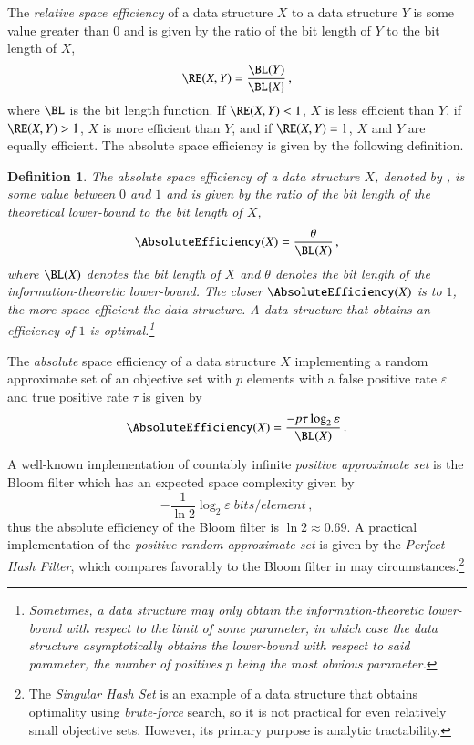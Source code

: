 \documentclass[10pt,final,hidelinks]{article}
\numberwithin{equation}{section}
\newcommand{\p}{p}
\newcommand{\tprate}{\tau}
\newcommand{\fprate}{\varepsilon}
\newcommand{\envnumstyle}{chapter}
\renewcommand{\envnumstyle}{chapter}
\renewcommand{\envnumstyle}{section}
\theoremstyle{plain}
\newtheorem{definition}{Definition}[\envnumstyle]
\begin{document}
The \emph{relative space efficiency} of a data structure $X$ to a data structure $Y$ is some value greater than $0$ and is given by the ratio of the bit length of $Y$ to the bit length of $X$,
\begin{equation}
    \RE(X,Y) = \frac{\BL(Y)}{\BL{X}}\,,
\end{equation}
where $\BL$ is the bit length function.
If $\RE(X,Y) < 1$, $X$ is less efficient than $Y$, if $\RE(X,Y) > 1$, $X$ is more efficient than $Y$, and if $\RE(X,Y) = 1$, $X$ and $Y$ are equally efficient.
The absolute space efficiency is given by the following definition.
\begin{definition}
The absolute space efficiency of a data structure $X$, denoted by , is some value between $0$ and $1$ and is given by the ratio of the bit length of the theoretical lower-bound to the bit length of $X$,
\begin{equation}
    \AbsoluteEfficiency(X) = \frac{\theta}{\BL(X)}\,,
\end{equation}
where $\BL(X)$ denotes the bit length of $X$ and $\theta$ denotes the bit length of the information-theoretic lower-bound.
The closer $\AbsoluteEfficiency(X)$ is to $1$, the more space-efficient the data structure.
A data structure that obtains an efficiency of $1$ is \emph{optimal}.\footnote{Sometimes, a data structure may only obtain the information-theoretic lower-bound with respect to the limit of some parameter, in which case the data structure \emph{asymptotically} obtains the lower-bound with respect to said parameter, the number of positives $\p$ being the most obvious parameter.}
\end{definition}

The \emph{absolute} space efficiency of a data structure $X$ implementing a random approximate set of an objective set with $\p$ elements with a false positive rate $\fprate$ and true positive rate $\tprate$ is given by
\begin{equation}
    \AbsoluteEfficiency(X) = \frac{-\p \tprate \log_2 \fprate}{\BL(X)}\,.
\end{equation}

A well-known implementation of countably infinite \emph{positive approximate set} is the Bloom filter\cite{bf} which has an expected space complexity given 
by
\begin{equation}
    -\frac{1}{\ln 2} \log_2 \fprate \; \si{bits \per element}\,,
\end{equation}
thus the absolute efficiency of the Bloom filter is $\ln 2 \approx 0.69$.
A practical implementation of the \emph{positive random approximate set} is given by the \emph{Perfect Hash Filter}\cite{phf}, which compares favorably to the Bloom filter in may circumstances.\footnote{The \emph{Singular Hash Set}\cite{shs} is an example of a data structure that obtains optimality using \emph{brute-force} search, so it is not practical for even relatively small objective sets. However, its primary purpose is analytic tractability.}
\end{document}
